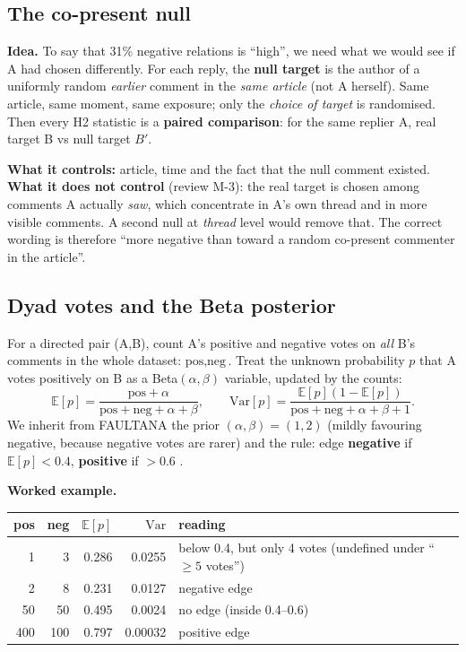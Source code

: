 \documentclass[11pt,a4paper]{article}
\newcommand{\E}{\mathbb{E}}
\begin{document}
\subsection{The co-present null}
\textbf{Idea.} To say that 31\% negative relations is ``high'', we need what we would see if A had chosen differently. For each reply, the \textbf{null target} is the author of a uniformly random \emph{earlier} comment in the \emph{same article} (not A herself). Same article, same moment, same exposure; only the \emph{choice of target} is randomised. Then every H2 statistic is a \textbf{paired comparison}: for the same replier A, real target B vs null target $B'$.

\textbf{What it controls:} article, time and the fact that the null comment existed. \textbf{What it does not control} (review M-3): the real target is chosen among comments A actually \emph{saw}, which concentrate in A's own thread and in more visible comments. A second null at \emph{thread} level would remove that. The correct wording is therefore ``more negative than toward a random co-present commenter in the article''.

\subsection{Dyad votes and the Beta posterior}
For a directed pair (A,B), count A's positive and negative votes on \emph{all} B's comments in the whole dataset: $\text{pos},\text{neg}$. Treat the unknown probability $p$ that A votes positively on B as a Beta$(\alpha,\beta)$ variable, updated by the counts:
\[
\E[p]=\frac{\text{pos}+\alpha}{\text{pos}+\text{neg}+\alpha+\beta},\qquad
\mathrm{Var}[p]=\frac{\E[p](1-\E[p])}{\text{pos}+\text{neg}+\alpha+\beta+1}.
\]
We inherit from FAULTANA the prior $(\alpha,\beta)=(1,2)$ (mildly favouring negative, because negative votes are rarer) and the rule: edge \textbf{negative} if $\E[p]<0.4$, \textbf{positive} if $>0.6$ \cite{faultana}.

\textbf{Worked example.}\par\smallskip
\begin{tabular}{@{}rrrrp{7.2cm}@{}}
\toprule
pos & neg & $\E[p]$ & $\mathrm{Var}$ & reading\\
\midrule
1 & 3 & 0.286 & 0.0255 & below 0.4, but only 4 votes (undefined under ``$\ge5$ votes'')\\
2 & 8 & 0.231 & 0.0127 & negative edge\\
50 & 50 & 0.495 & 0.0024 & no edge (inside 0.4--0.6)\\
400 & 100 & 0.797 & 0.00032 & positive edge\\
\bottomrule
\end{tabular}
\end{document}
